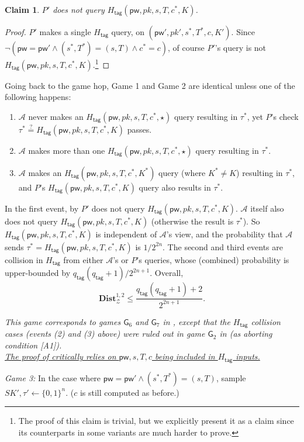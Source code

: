 \documentclass{article}
\theoremstyle{plain}
\newtheorem{claim}{Claim}
\theoremstyle{definition}
\theoremstyle{remark}
\newcommand{\adv}{\mathcal{A}}
\newcommand{\env}{\mathcal{Z}}
\newcommand{\Dist}{\mathbf{Dist}}
\newcommand{\Htag}{H_\mathsf{tag}}
\newcommand{\pw}{\mathsf{pw}}
\newcommand{\qtag}{q_\mathsf{tag}}
\begin{document}
\begin{claim}
\label{clm:htag}
$P'$ does not query $\Htag(\pw,pk,s,T,c^*,K)$.
\end{claim}
\begin{proof}
$P'$ makes a single $\Htag$ query, on $(\pw',pk',s^*,T^*,c,K')$. Since $\neg(\pw = \pw' \land (s^*,T^*) = (s,T) \land c^* = c)$, of course $P'$'s query is not $\Htag(\pw,pk,s,T,c^*,K)$.\footnote{The proof of this claim is trivial, but we explicitly present it as a claim since its counterparts in some variants are much harder to prove.}
\end{proof}
Going back to the game hop, Game 1 and Game 2 are identical unless one of the following happens:
\begin{enumerate}
  \item $\adv$ never makes an $\Htag(\pw,pk,s,T,c^*,\star)$ query resulting in $\tau^*$, yet $P$'s check $\tau^* \stackrel{?}{=} \Htag(\pw,pk,s,T,c^*,K)$ passes.
  \item $\adv$ makes more than one $\Htag(\pw,pk,s,T,c^*,\star)$ query resulting in $\tau^*$.
  \item $\adv$ makes an $\Htag(\pw,pk,s,T,c^*,K^*)$ query (where $K^* \neq K$) resulting in $\tau^*$, and $P$'s $\Htag(\pw,\allowbreak pk, s,T,c^*,K)$ query also results in $\tau^*$.
\end{enumerate}

In the first event, by  $P'$ does not query $\Htag(\pw,pk,s,T,c^*,K)$. $\adv$ itself also does not query $\Htag(\pw,pk,s,T,c^*,K)$ (otherwise the result is $\tau^*$). So $\Htag(\pw,pk,s,T,c^*,K)$ is independent of $\adv$'s view, and the probability that $\adv$ sends $\tau^* = \Htag(\pw,pk,s,T,c^*,K)$ is $1/2^{2n}$. The second and third events are collision in $\Htag$ from either $\adv$'s or $P$'s queries, whose (combined) probability is upper-bounded by $\qtag(\qtag+1)/2^{2n+1}$. Overall,
\[
\Dist_\env^{1,2} \leq \frac{\qtag(\qtag+1)+2}{2^{2n+1}}.
\]

\emph{{\color{red}This game corresponds to games $\mathsf{G}_6$ and $\mathsf{G}_7$ in \cite{EPRINT:ArrBarJar25}, except that the $\Htag$ collision cases (events (2) and (3) above) were ruled out in game $\mathsf{G}_2$ in \cite{EPRINT:ArrBarJar25} (as aborting condition [A1]). \\
\indent\ul{The proof of \mbox{}
critically relies on $\pw,s,T,c$ being included in $\Htag$ inputs.}}}

\medskip\noindent\emph{Game 3:} In the case where $\pw = \pw' \land (s^*,T^*) = (s,T)$, sample $SK',\tau' \gets \{0,1\}^n$. ($c$ is still computed as before.)
\end{document}
